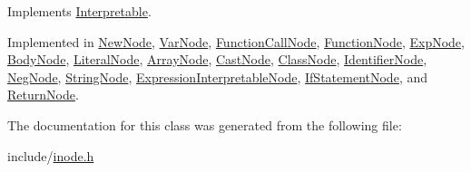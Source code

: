 Implements \hyperlink{classInterpretable_aa4503765d6dbd00bff7beda913f112ee}{Interpretable}.



Implemented in \hyperlink{classNewNode_a77447b9402f0153401bf0e623b5f1e6e}{New\+Node}, \hyperlink{classVarNode_af2eed4fcade96d174c5b1f623b6bcdf6}{Var\+Node}, \hyperlink{classFunctionCallNode_a1d0d8806b7dd501ed43da58f77f7c49e}{Function\+Call\+Node}, \hyperlink{classFunctionNode_a059e6682cd51d0e126372a7af257ea5a}{Function\+Node}, \hyperlink{classExpNode_aedff3b19b9e36a77e4558a168b81debf}{Exp\+Node}, \hyperlink{classBodyNode_a5ab94984d059dba1f7d2baa6022712ba}{Body\+Node}, \hyperlink{classLiteralNode_abb32ed943c6a5b2029a496ac04885b2a}{Literal\+Node}, \hyperlink{classArrayNode_a029220b946233e22cb661fcfac9634d0}{Array\+Node}, \hyperlink{classCastNode_a2a909a7531791bcbc53c514a01ce5024}{Cast\+Node}, \hyperlink{classClassNode_a7515421face64d74e99e180fb297684b}{Class\+Node}, \hyperlink{classIdentifierNode_aa7be7da3e018352f8b549fcac3a8155a}{Identifier\+Node}, \hyperlink{classNegNode_a35ff48d55ab355e27f33dcc21483e4c7}{Neg\+Node}, \hyperlink{classStringNode_ae92c0858cd07baf0c6417f7bdfce9f0d}{String\+Node}, \hyperlink{classExpressionInterpretableNode_a43650f046c48fc539f77a207e3c9181e}{Expression\+Interpretable\+Node}, \hyperlink{classIfStatementNode_aef627f32330e55f8bb9e5ac2f2f5f3f8}{If\+Statement\+Node}, and \hyperlink{classReturnNode_ae6c35829787a4f880b3ee1fa4b2e98d3}{Return\+Node}.



The documentation for this class was generated from the following file\+:\begin{DoxyCompactItemize}
\item 
include/\hyperlink{inode_8h}{inode.\+h}\end{DoxyCompactItemize}
